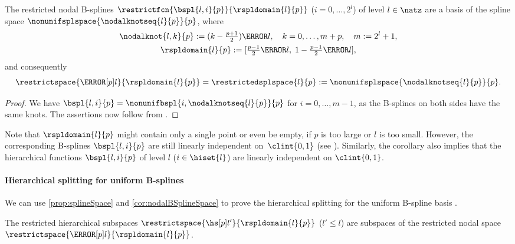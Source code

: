\begin{corollary}
  \label{cor:nodalBSplineSpace}
  The restricted nodal B-splines $\restrictfcn{\bspl{l,i}{p}}{\rspldomain{l}{p}}$
  ($i = 0, \dotsc, 2^l$)
  of level $l \in \natz$ are
  a basis of the spline space $\nonunifsplspace{\nodalknotseq{l}{p}}{p}$,
  where
  \begin{subequations}
    \begin{gather}
      \nodalknot{l,k}{p}
      := (k - \tfrac{p+1}{2}) \ms{l},\quad
      k = 0, \dotsc, m + p,\quad
      m := 2^l + 1,\\
      \rspldomain{l}{p} := [\tfrac{p-1}{2} \ms{l},\;
      1 - \tfrac{p-1}{2} \ms{l}],
    \end{gather}
  \end{subequations}
  and consequently
  \begin{equation}
    \restrictspace{\nsbspl{l}{p}}{\rspldomain{l}{p}}
    = \restrictedsplspace{l}{p}
    := \nonunifsplspace{\nodalknotseq{l}{p}}{p}.
  \end{equation}
\end{corollary}

\begin{proof}
  We have $\bspl{l,i}{p} = \nonunifbspl{i,\nodalknotseq{l}{p}}{p}$ for
  $i = 0, \dotsc, m - 1$,
  as the B-splines on both sides have the same knots.
  The assertions now follow from .
\end{proof}

\vspace{1em}

Note that $\rspldomain{l}{p}$ might contain only a single point or even be empty,
if $p$ is too large or $l$ is too small.
However, the corresponding B-splines $\bspl{l,i}{p}$ are still linearly
independent on~$\clint{0, 1}$ (see \cite{Hoellig13Approximation}).
Similarly, the corollary also implies that the hierarchical functions
$\bspl{l,i}{p}$ of level $l$ ($i \in \hiset{l}$)
are linearly independent on $\clint{0, 1}$.

\paragraph{Hierarchical splitting for uniform B-splines}

We can use \cref{prop:splineSpace} and \cref{cor:nodalBSplineSpace}
to prove the hierarchical splitting for the uniform B-spline basis
\cite{Valentin16Hierarchical}.

\begin{lemma}
  \label{lemma:hierBSplineInNodalSpace}
  The restricted hierarchical subspaces
  $\restrictspace{\hsbspl{l'}{p}}{\rspldomain{l}{p}}$ ($l' \le l$) are
  subspaces of the restricted nodal space $\restrictspace{\nsbspl{l}{p}}{\rspldomain{l}{p}}$.
\end{lemma}


